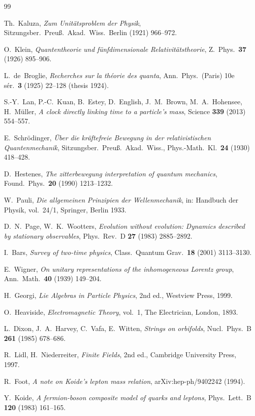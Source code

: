 \begin{thebibliography}{99}

Th.~Kaluza, \textit{Zum Unitätsproblem der Physik},
Sitzungsber.\ Preuß.\ Akad.\ Wiss.\ Berlin (1921) 966--972.

O.~Klein, \textit{Quantentheorie und fünfdimensionale Relativitätstheorie},
Z.\ Phys.\ \textbf{37} (1926) 895--906.

L.~de~Broglie, \textit{Recherches sur la théorie des quanta},
Ann.\ Phys.\ (Paris) 10e sér.\ \textbf{3} (1925) 22--128 (thesis 1924).

S.-Y.~Lan, P.-C.~Kuan, B.~Estey, D.~English, J.~M.~Brown, M.~A.~Hohensee, H.~Müller,
\textit{A clock directly linking time to a particle's mass},
Science \textbf{339} (2013) 554--557.

E.~Schrödinger, \textit{Über die kräftefreie Bewegung in der relativistischen Quantenmechanik},
Sitzungsber.\ Preuß.\ Akad.\ Wiss., Phys.-Math.\ Kl.\ \textbf{24} (1930) 418--428.

D.~Hestenes, \textit{The zitterbewegung interpretation of quantum mechanics},
Found.\ Phys.\ \textbf{20} (1990) 1213--1232.

W.~Pauli, \textit{Die allgemeinen Prinzipien der Wellenmechanik},
in: Handbuch der Physik, vol.~24/1, Springer, Berlin 1933.

D.~N.~Page, W.~K.~Wootters, \textit{Evolution without evolution: Dynamics described by stationary
observables}, Phys.\ Rev.\ D \textbf{27} (1983) 2885--2892.

I.~Bars, \textit{Survey of two-time physics},
Class.\ Quantum Grav.\ \textbf{18} (2001) 3113--3130.

E.~Wigner, \textit{On unitary representations of the inhomogeneous Lorentz group},
Ann.\ Math.\ \textbf{40} (1939) 149--204.

H.~Georgi, \textit{Lie Algebras in Particle Physics}, 2nd ed., Westview Press, 1999.

O.~Heaviside, \textit{Electromagnetic Theory}, vol.~1, The Electrician, London, 1893.

L.~Dixon, J.~A.~Harvey, C.~Vafa, E.~Witten, \textit{Strings on orbifolds},
Nucl.\ Phys.\ B \textbf{261} (1985) 678--686.

R.~Lidl, H.~Niederreiter, \textit{Finite Fields}, 2nd ed., Cambridge University Press, 1997.

R.~Foot, \textit{A note on Koide's lepton mass relation}, arXiv:hep-ph/9402242 (1994).

Y.~Koide, \textit{A fermion-boson composite model of quarks and leptons},
Phys.\ Lett.\ B \textbf{120} (1983) 161--165.

\end{thebibliography}
